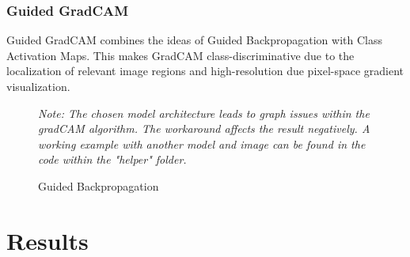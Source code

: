 \documentclass{article}
\begin{document}
\subsubsection{Guided GradCAM}
Guided GradCAM combines the ideas of Guided Backpropagation with Class Activation Maps.
This makes GradCAM class-discriminative due to the localization of relevant image regions and high-resolution due pixel-space gradient visualization.
\begin{figure}[H]
  \centering
  \hspace{0.5cm}
  \hspace{0.5cm}
  \caption{Guided Backpropagation}
  \small \textit{{Note: The chosen model architecture leads to graph issues within the gradCAM algorithm. The workaround affects the result negatively.
  A working example with another model and image can be found in the code within the "helper" folder.}}
\end{figure}

\section{Results}
\end{document}
